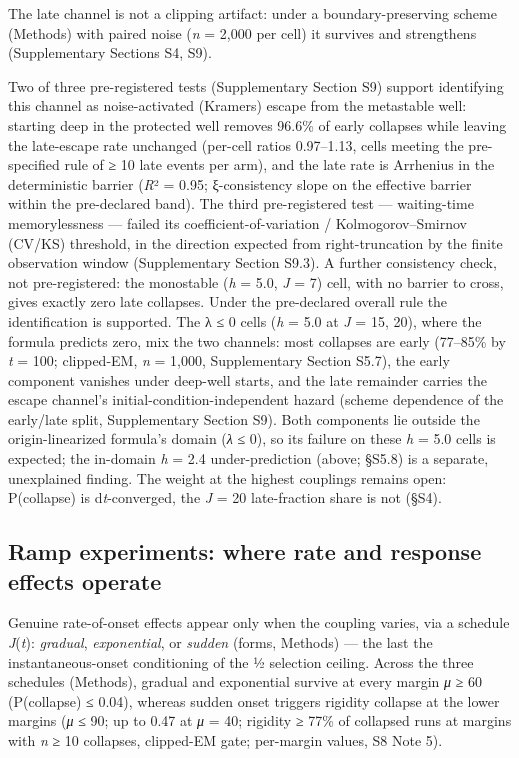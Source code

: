 \documentclass[11pt,letterpaper]{article}
\begin{document}
The late channel is not a clipping artifact: under a boundary-preserving scheme (Methods) with paired noise (\emph{n} = 2,000 per cell) it survives and strengthens (Supplementary Sections S4, S9).

Two of three pre-registered tests (Supplementary Section S9) support identifying this channel as noise-activated (Kramers) escape from the metastable well: starting deep in the protected well removes 96.6\% of early collapses while leaving the late-escape rate unchanged (per-cell ratios 0.97--1.13, cells meeting the pre-specified rule of ≥ 10 late events per arm), and the late rate is Arrhenius in the deterministic barrier (\emph{R}² = 0.95; ξ-consistency slope on the effective barrier within the pre-declared band). The third pre-registered test --- waiting-time memorylessness --- failed its coefficient-of-variation / Kolmogorov--Smirnov (CV/KS) threshold, in the direction expected from right-truncation by the finite observation window (Supplementary Section S9.3). A further consistency check, not pre-registered: the monostable (\emph{h} = 5.0, \emph{J} = 7) cell, with no barrier to cross, gives exactly zero late collapses. Under the pre-declared overall rule the identification is supported. The λ ≤ 0 cells (\emph{h} = 5.0 at \emph{J} = 15, 20), where the formula predicts zero, mix the two channels: most collapses are early (77--85\% by \emph{t} = 100; clipped-EM, \emph{n} = 1,000, Supplementary Section S5.7), the early component vanishes under deep-well starts, and the late remainder carries the escape channel's initial-condition-independent hazard (scheme dependence of the early/late split, Supplementary Section S9). Both components lie outside the origin-linearized formula's domain (\emph{λ} ≤ 0), so its failure on these \emph{h} = 5.0 cells is expected; the in-domain \emph{h} = 2.4 under-prediction (above; §S5.8) is a separate, unexplained finding. The weight at the highest couplings remains open: P(collapse) is d\emph{t}-converged, the \emph{J} = 20 late-fraction share is not (§S4).

\subsection{Ramp experiments: where rate and response effects operate}\label{ramp-experiments-where-rate-and-response-effects-operate}

Genuine rate-of-onset effects appear only when the coupling varies, via a schedule \emph{J}(\emph{t}): \emph{gradual}, \emph{exponential}, or \emph{sudden} (forms, Methods) --- the last the instantaneous-onset conditioning of the ½ selection ceiling. Across the three schedules (Methods), gradual and exponential survive at every margin \emph{μ} ≥ 60 (P(collapse) ≤ 0.04), whereas sudden onset triggers rigidity collapse at the lower margins (\emph{μ} ≤ 90; up to 0.47 at \emph{μ} = 40; rigidity ≥ 77\% of collapsed runs at margins with \emph{n} ≥ 10 collapses, clipped-EM gate; per-margin values, S8 Note 5).
\end{document}
